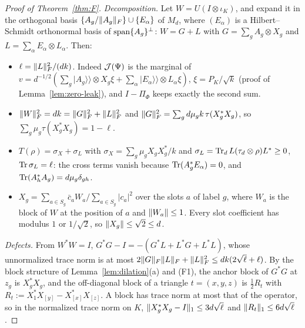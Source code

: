 \begin{proof}[Proof of Theorem~\ref{thm:F}]
\emph{Decomposition.} Let $W=U(I\otimes\iota_K)$, and expand it in the orthogonal basis $\{A_g/\lVert A_g\rVert_F\}\cup\{E_\alpha\}$ of $M_d$, where $(E_\alpha)$ is a
Hilbert--Schmidt orthonormal basis of $\operatorname{span}\{A_g\}^\perp$: $W=G+L$ with $G=\sum_gA_g\otimes X_g$ and $L=\sum_\alpha E_\alpha\otimes L_\alpha$. Then:
\begin{itemize}[leftmargin=2.4em,itemsep=1pt]
\item[(f1)] $\ell=\lVert L\rVert_F^2/(dk)$. Indeed $\mathcal J(\Psi)$ is the marginal of $v=d^{-1/2}(\sum_g\vert A_g\rangle\!\rangle\otimes X_g\xi+\sum_\alpha\vert E_\alpha\rangle\!\rangle\otimes L_\alpha\xi)$,
$\xi=P_K/\sqrt k$ (proof of Lemma~\ref{lem:zero-leak}), and $I-\Pi_\Phi$ keeps exactly the second sum.
\item[(f2)] $\lVert W\rVert_F^2=dk=\lVert G\rVert_F^2+\lVert L\rVert_F^2$ and $\lVert G\rVert_F^2=\sum_gd\mu_gk\,\tau(X_g^*X_g)$, so $\sum_g\mu_g\tau(X_g^*X_g)=1-\ell$.
\item[(f3)] $T(\rho)=\sigma_X+\sigma_L$ with $\sigma_X=\sum_g\mu_gX_gX_g^*/k$ and $\sigma_L=\operatorname{Tr}_dL(\tau_d\otimes\rho)L^*\ge0$, $\operatorname{Tr}\sigma_L=\ell$: the cross terms vanish because
$\operatorname{Tr}(A_g^*E_\alpha)=0$, and $\operatorname{Tr}(A_h^*A_g)=d\mu_g\delta_{gh}$.
\item[(f4)] $X_g=\sum_{a\in S_g}\bar c_aW_a/\sum_{a\in S_g}|c_a|^2$ over the slots $a$ of label $g$, where $W_a$ is the block of $W$ at the position of $a$ and $\lVert W_a\rVert\le1$.
Every slot coefficient has modulus $1$ or $1/\sqrt2$, so $\lVert X_g\rVert\le\sqrt2\le d$.
\end{itemize}

\emph{Defects.} From $W^*W=I$, $G^*G-I=-(G^*L+L^*G+L^*L)$, whose unnormalized trace norm is at most $2\lVert G\rVert_F\lVert L\rVert_F+\lVert L\rVert_F^2\le dk(2\sqrt\ell+\ell)$. By the
block structure of Lemma~\ref{lem:dilation}(a) and (F1), the anchor block of $G^*G$ at $z_g$ is $X_g^*X_g$, and the off-diagonal block of a triangle $t=(x,y,z)$ is
$\frac12R_t$ with $R_t:=X_1^*X_{[y]}-X_{[x]}^*X_{[z]}$. A block has trace norm at most that of the operator, so in the normalized trace norm on $K$,
$\lVert X_g^*X_g-I\rVert_1\le3d\sqrt\ell$ and $\lVert R_t\rVert_1\le6d\sqrt\ell$.


\end{proof}
